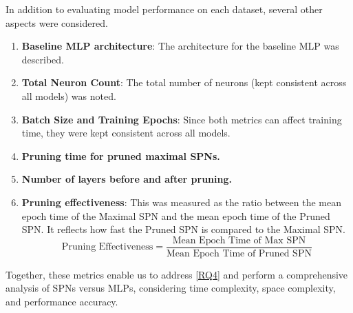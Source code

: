 In addition to evaluating model performance on each dataset, several other aspects were considered.

\begin{enumerate}
\item \textbf{Baseline MLP architecture}: The architecture for the baseline MLP was described.
\item \textbf{Total Neuron Count}: The total number of neurons (kept consistent across all models) was noted.
\item \textbf{Batch Size and Training Epochs}: Since both metrics can affect training time, they were kept consistent across all models.
\item \textbf{Pruning time for pruned maximal SPNs.}
\item \textbf{Number of layers before and after pruning.}
\item \textbf{Pruning effectiveness}: This was measured as the ratio between the mean epoch time of the Maximal SPN and the mean epoch time of the Pruned SPN. It reflects how fast the Pruned SPN is compared to the Maximal SPN.
    \[
    \text{Pruning Effectiveness} = \frac{\text{Mean Epoch Time of Max SPN}}{\text{Mean Epoch Time of Pruned SPN}}
    \]
\end{enumerate}

Together, these metrics enable us to address \ref{RQ4} and perform a comprehensive analysis of SPNs versus MLPs, considering time complexity, space complexity, and performance accuracy.